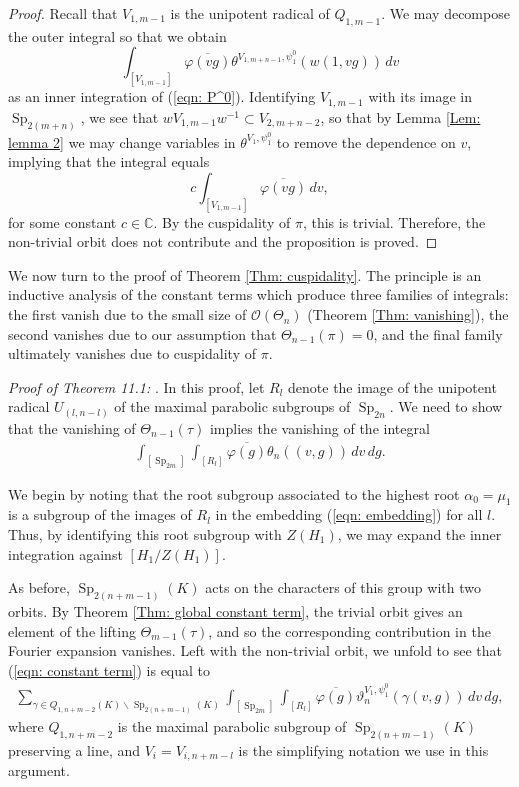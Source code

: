 \documentclass[11pt,reqno]{amsart}
\theoremstyle{definition}
\theoremstyle{remark}
\theoremstyle{definition}
\begin{document}
\begin{proof}
Recall that $V_{1,m-1}$ is the unipotent radical of $Q_{1,m-1}$. We may decompose the outer integral so that we obtain
\[
\int_{[V_{1,m-1}]}\overline{\varphi(vg)}\theta^{V_{1,m+n-1},\psi^0_{1}}(w(1,vg))\,dv
\]
as an inner integration of (\ref{eqn: P^0}). Identifying $V_{1,m-1}$ with its image in $\operatorname{Sp}_{2(m+n)}$, we see that $w V_{1,m-1}w^{-1} \subset V_{2,m+n-2}$, so that by Lemma \ref{Lem: lemma 2} we may change variables in $\theta^{V_{1},\psi^0_{1}}$ to remove the dependence on $v$, implying that the integral equals
\[
c\int_{[V_{1,m-1}]}\overline{\varphi(vg)}\,dv,
\]
for some constant $c\in {\mathbb C}$. By the cuspidality of $\pi$, this is trivial.
Therefore, the non-trivial orbit does not contribute and the proposition is proved.
\end{proof}

We now turn to the proof of Theorem \ref{Thm: cuspidality}. The principle is an inductive analysis of the constant terms which produce three families of integrals: the first vanish due to the small size of ${\mathcal{O}}(\Theta_n)$ (Theorem \ref{Thm: vanishing}), the second vanishes due to our assumption that $\Theta_{n-1}(\pi)=0$, and the final family ultimately vanishes due to cuspidality of $\pi$.

\noindent
\emph{Proof of Theorem 11.1:}
. 
In this proof, let $R_l $ denote the image of the unipotent radical $U_{(l,n-l)}$ of the maximal parabolic subgroups of $\operatorname{Sp}_{2n}$. We need to show that the vanishing of $\Theta_{n-1}(\tau)$ implies the vanishing of the integral
\begin{align}\label{eqn: constant term}
\int_{[\operatorname{Sp}_{2m}]}\int_{[R_l]}\overline{\varphi(g)}\theta_{n}((v,g))\,dv\,dg. 
\end{align}

We begin by noting that the root subgroup associated to the highest root ${\alpha}_0=\mu_1$ is a subgroup of the images of $R_l$ in the embedding (\ref{eqn: embedding}) for all $l$. Thus, by identifying this root subgroup with $Z(H_1)$, we may expand the inner integration against $[H_1/Z(H_1)]$. 

As before, $\operatorname{Sp}_{2(n+m-1)}(K)$ acts on the characters of this group with two orbits. By Theorem \ref{Thm: global constant term}, the trivial orbit gives an element of the lifting $\Theta_{m-1}(\tau)$, and so the corresponding contribution in the Fourier expansion vanishes. Left with the non-trivial orbit, we unfold to see that (\ref{eqn: constant term}) is equal to
\begin{align}\label{eqn: step 1}
\sum_{{\gamma}\in Q_{1,n+m-2}(K)\backslash\operatorname{Sp}_{2(n+m-1)}(K)} \int_{[\operatorname{Sp}_{2m}]}\int_{[R_l]}\overline{\varphi(g)}\vartheta^{V_1,\psi_1^0}_{n}({\gamma}(v,g))\,dv\,dg,
\end{align}
where $Q_{1,n+m-2}$ is the maximal parabolic subgroup of $\operatorname{Sp}_{2(n+m-1)}(K)$ preserving a line, and $V_i= V_{i,n+m-l}$ is the simplifying notation we use in this argument.
\end{document}
